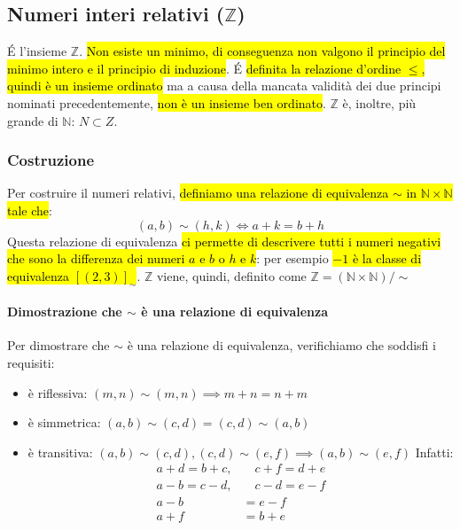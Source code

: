 \subsection{Numeri interi relativi ($\mathbb{Z}$)}
\'E l'insieme $\mathbb{Z}$. \hl{Non esiste un minimo, di conseguenza non valgono 
il principio del minimo intero e il principio di induzione}. \'E \hl{definita la
relazione d'ordine $\leq$, quindi è un insieme ordinato} ma a causa della
mancata validità dei due principi nominati precedentemente, \hl{non è un insieme
ben ordinato}. $\mathbb{Z}$ è, inoltre, più grande di $\mathbb{N}$: $ N \subset Z$.

\subsubsection{Costruzione} 
Per costruire il numeri relativi, \hl{definiamo una relazione di equivalenza 
$\sim$ in $\mathbb{N} \times \mathbb{N}$ tale che}:
\[ (a,b) \sim (h,k) \iff a+k=b+h \]
Questa relazione di equivalenza \hl{ci permette di descrivere tutti i numeri negativi
che sono la differenza dei numeri $a$ e $b$ o $h$ e $k$}: per esempio \hl{$-1$ è la 
classe di equivalenza $[(2,3)]_{\sim}$}. $\mathbb{Z}$ viene, quindi, definito come
$\mathbb{Z} = (\mathbb{N} \times \mathbb{N}) / \sim$

\paragraph{Dimostrazione che $\sim$ è una relazione di equivalenza} Per
dimostrare che $\sim$ è una relazione di equivalenza, verifichiamo che soddisfi
i requisiti:
\begin{itemize}
    \item è riflessiva: $(m,n) \sim (m,n) \implies m+n = n+m$
    \item è simmetrica: $(a,b) \sim (c,d) = (c,d) \sim (a,b)$
    \item è transitiva: $(a,b) \sim (c,d), (c,d) \sim (e,f) \implies (a,b)\sim(e,f)$
        Infatti: 
        \begin{align*}
            a+d=b+c, &\quad c+f=d+e \\
            a-b=c-d, &\quad c-d=e-f \\
            a-b&=e-f \\
            a+f&=b+e
        \end{align*}
\end{itemize}

